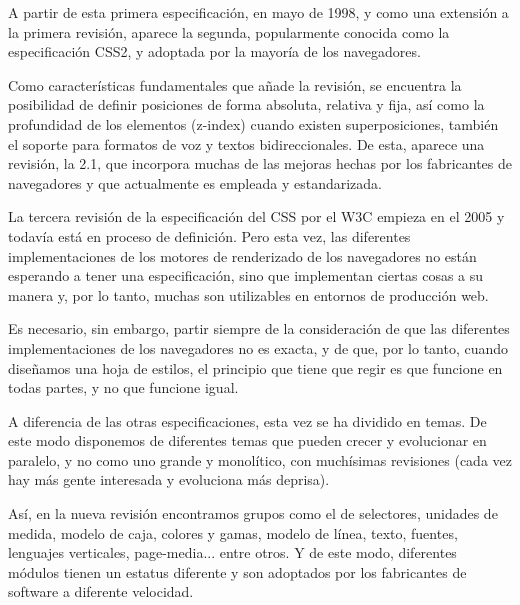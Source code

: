 A partir de esta primera especificación, en mayo de 1998, y como una extensión a la primera revisión, aparece la segunda, popularmente conocida como la especificación CSS2, y adoptada por la mayoría de los navegadores. 

Como características fundamentales que añade la revisión, se encuentra la posibilidad de definir posiciones de forma absoluta, relativa y fija, así como la profundidad de los elementos (z-index) cuando existen superposiciones, también el soporte para formatos de voz y textos bidireccionales. De esta, aparece una revisión, la 2.1, que incorpora muchas de las mejoras hechas por los fabricantes de navegadores y que actualmente es empleada y estandarizada.

La tercera revisión de la especificación del CSS por el W3C empieza en el 2005 y todavía está en proceso de definición. Pero esta vez, las diferentes implementaciones de los motores de renderizado de los navegadores no están esperando a tener una especificación, sino que implementan ciertas cosas a su manera y, por lo tanto, muchas son utilizables en entornos de producción web. 

Es necesario, sin embargo, partir siempre de la consideración de que las diferentes implementaciones de los navegadores no es exacta, y de que, por lo tanto, cuando diseñamos una hoja de estilos, el principio que tiene que regir es que funcione en todas partes, y no que funcione igual.

A diferencia de las otras especificaciones, esta vez se ha dividido en temas. De este modo disponemos de diferentes temas que pueden crecer y evolucionar en paralelo, y no como uno grande y monolítico, con muchísimas revisiones (cada vez hay más gente interesada y evoluciona más deprisa).

Así, en la nueva revisión encontramos grupos como el de selectores, unidades de medida, modelo de caja, colores y gamas, modelo de línea, texto, fuentes, lenguajes verticales, page-media... entre otros. Y de este modo, diferentes módulos tienen un estatus diferente y son adoptados por los fabricantes de software a diferente velocidad.


